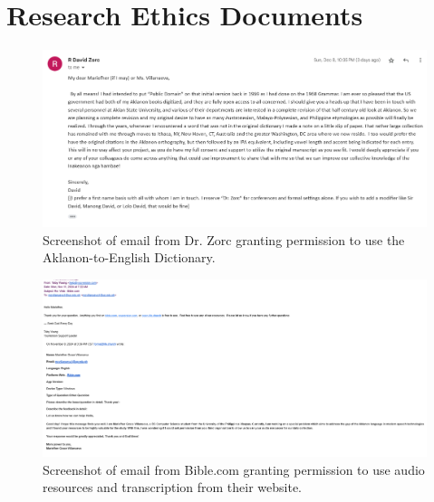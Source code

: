 %
%
%                 

\chapter{Research Ethics Documents}
\label{sec:appendixa}

\begin{figure}[h!]
    \centering
    \includegraphics[width=\textwidth]{./appendix/dav.png}
    \caption{Screenshot of email from Dr. Zorc granting permission to use the Aklanon-to-English Dictionary.}
    \label{fig:sirDavid}
\end{figure}

\begin{figure}[h!]
    \centering
    \includegraphics[width=\textwidth]{./appendix/biblepermision.png}
    \caption{Screenshot of email from Bible.com granting permission to use audio resources and transcription from their website.}
    \label{fig:bible}
\end{figure}

